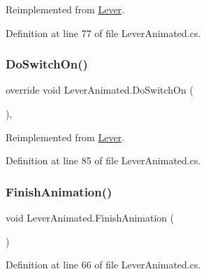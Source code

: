Reimplemented from \mbox{\hyperlink{class_lever_af15223c9c4a5fd08045bd4a7aca73351}{Lever}}.



Definition at line 77 of file Lever\+Animated.\+cs.

\mbox{\label{class_lever_animated_a2b655bf2b974e395ab4ffb343056c63d}} 
\subsubsection{\texorpdfstring{Do\+Switch\+On()}{DoSwitchOn()}}
{\footnotesize\ttfamily override void Lever\+Animated.\+Do\+Switch\+On (\begin{DoxyParamCaption}{ }\end{DoxyParamCaption})\hspace{0.3cm}{\ttfamily [protected]}, {\ttfamily [virtual]}}



Reimplemented from \mbox{\hyperlink{class_lever_a9941602be9b41c21f29d18050941aa68}{Lever}}.



Definition at line 85 of file Lever\+Animated.\+cs.

\mbox{\label{class_lever_animated_a0b36ecd4e414019787a0554171ee5a7a}} 
\subsubsection{\texorpdfstring{Finish\+Animation()}{FinishAnimation()}}
{\footnotesize\ttfamily void Lever\+Animated.\+Finish\+Animation (\begin{DoxyParamCaption}{ }\end{DoxyParamCaption})}



Definition at line 66 of file Lever\+Animated.\+cs.

\mbox{\label{class_lever_animated_afbb34fdee619015300e91e7617ab79e5}} 
